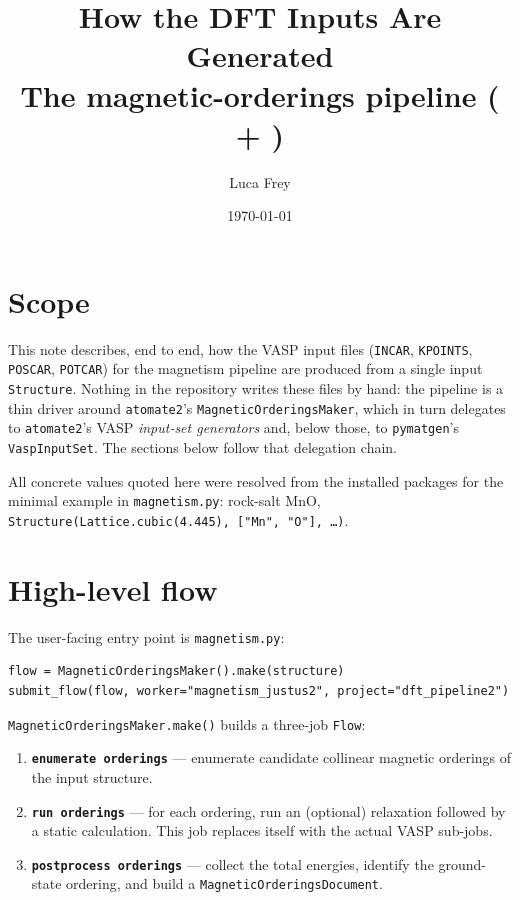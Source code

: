 \documentclass[11pt]{article}
\title{How the DFT Inputs Are Generated\\[2pt]
\large The magnetic-orderings pipeline (\code{atomate2} + \code{jobflow-remote})}
\author{Luca Frey}
\date{\today}
\newcommand{\code}[1]{\texttt{\def\_{\textunderscore\allowbreak}#1}}
\begin{document}
\maketitle

\section{Scope}

This note describes, end to end, how the VASP input files (\code{INCAR},
\code{KPOINTS}, \code{POSCAR}, \code{POTCAR}) for the magnetism pipeline are
produced from a single input \code{Structure}. Nothing in the repository writes
these files by hand: the pipeline is a thin driver around \code{atomate2}'s
\code{MagneticOrderingsMaker}, which in turn delegates to \code{atomate2}'s VASP
\emph{input-set generators} and, below those, to \code{pymatgen}'s
\code{VaspInputSet}. The sections below follow that delegation chain.

All concrete values quoted here were resolved from the installed packages for the
minimal example in \code{magnetism.py}: rock-salt MnO,
\code{Structure(Lattice.cubic(4.445), ["Mn", "O"], \dots)}.

\section{High-level flow}

The user-facing entry point is \code{magnetism.py}:

\begin{lstlisting}
flow = MagneticOrderingsMaker().make(structure)
submit_flow(flow, worker="magnetism_justus2", project="dft_pipeline2")
\end{lstlisting}

\code{MagneticOrderingsMaker.make()} builds a three-job \code{Flow}:

\begin{enumerate}
  \item \textbf{\code{enumerate orderings}} --- enumerate candidate collinear
        magnetic orderings of the input structure.
  \item \textbf{\code{run orderings}} --- for each ordering, run an (optional)
        relaxation followed by a static calculation. This job replaces itself
        with the actual VASP sub-jobs.
  \item \textbf{\code{postprocess orderings}} --- collect the total energies,
        identify the ground-state ordering, and build a
        \code{MagneticOrderingsDocument}.
\end{enumerate}
\end{document}
